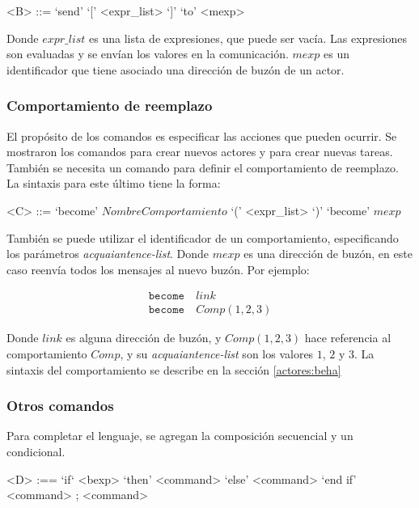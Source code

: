 \begin{grammar}
  <B> ::= `send' `[' <expr_list> `]' `to' <mexp>  
\end{grammar}

Donde $expr\_list$ es una lista de expresiones, que puede ser vacía. Las expresiones son evaluadas y se envían los valores en la comunicación. $mexp$ es un identificador que tiene asociado una dirección de buzón de un actor. 

\subsubsection*{Comportamiento de reemplazo}

El propósito de los comandos es especificar las acciones que pueden ocurrir. Se mostraron los comandos para crear nuevos actores y para crear nuevas tareas. También se necesita un comando para definir el comportamiento de reemplazo. La sintaxis para este último tiene la forma:

\begin{grammar}
  <C> ::= `become' $NombreComportamiento$ `(' <expr_list> `)'
  \alt `become' $mexp$
\end{grammar}

También se puede utilizar el identificador de un comportamiento, especificando los parámetros \textit{acquaiantence-list}. Donde $mexp$ es una dirección de buzón, en este caso reenvía todos los mensajes al nuevo buzón.  Por ejemplo:

\begin{align*}
 \texttt{become}&\ link \\
 \texttt{become}&\ Comp(1,2,3) 
\end{align*}

Donde $link$ es alguna dirección de buzón, y $Comp(1,2,3)$ hace referencia al comportamiento $Comp$, y su \textit{acquaiantence-list} son los valores $1$, $2$ y $3$. La sintaxis del comportamiento se describe en la sección \ref{actores:beha}

\subsubsection*{Otros comandos}

Para completar el lenguaje, se agregan la composición secuencial y un condicional.

\begin{grammar}
  <D> :== `if` <bexp> `then' <command> `else' <command> `end if'
  \alt <command> ; <command>
\end{grammar}

